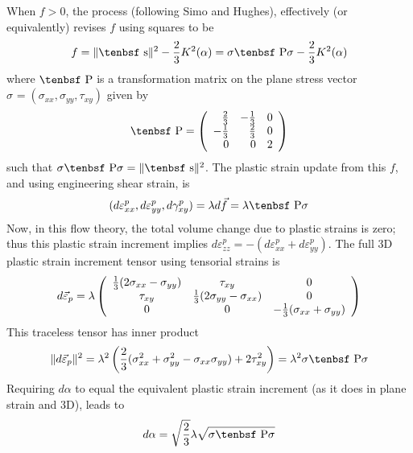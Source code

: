 \documentclass[11pt]{article}
\def\dev{\hbox{\tenbsf s}}
\def\dpl{d \vec{\varepsilon}_{p}}
\def\df{d \vec{f}}
\def\P{\hbox{\tenbsf P}}
\def\s#1{\sigma_{#1}}
\begin{document}
When $f>0$, the process (following Simo and Hughes), effectively (or equivalently) revises $f$ using squares to be
\begin{equation}
       f = \|\dev\|^2 - {2\over 3}K^2(\alpha) = \s{} \P\s{} - {2\over 3}K^2(\alpha)
\end{equation}
where $\P$ is a transformation matrix on the plane stress vector $\s{} = (\s{xx}, \s{yy}, \tau_{xy})$ given by
\begin{equation}
          \P = \left( \begin{array}{rrr}
                    {2\over 3} & -{1\over 3} & 0 \\ 
                    -{1\over 3} & {2\over 3} & 0 \\ 0 & 0 & 2 \end{array}\right)
\end{equation}
such that $\s{} \P\s{} = \|\dev\|^2$. The plastic strain update from this $f$, and using engineering shear strain, is
\begin{equation}
     (d\varepsilon_{xx}^p,  d\varepsilon_{yy}^p, d\gamma_{xy}^p) = \lambda \df = \lambda \P\s{}
\end{equation}
Now, in this flow theory, the total volume change due to plastic strains is zero; thus this plastic strain increment implies $d\varepsilon_{zz}^p = - (d\varepsilon_{xx}^p + d\varepsilon_{yy}^p)$. The full 3D plastic strain increment tensor using tensorial strains is
\begin{equation}
          \dpl = \lambda \left( \begin{array}{ccc}
                    {1\over 3}(2\s{xx}-\s{yy})& \tau_{xy} & 0 \\ 
                    \tau_{xy} & {1\over 3}(2\s{yy}-\s{xx}) & 0 \\ 0 & 0 & -{1\over 3}(\s{xx}+\s{yy}) \end{array}\right)
\end{equation}
This traceless tensor has inner product
\begin{equation}
  \|\dpl\|^2 = \lambda^2 \left( {2\over 3}(\s{xx}^2 + \s{yy}^2 - \s{xx}\s{yy}) + 2\tau_{xy}^2\right) = \lambda^2 \s{} \P\s{}
\end{equation}
Requiring $d\alpha$ to equal the equivalent plastic strain increment (as it does in plane strain and 3D), leads to
\begin{equation}
        d\alpha = \sqrt{2\over3}\lambda \sqrt{\s{} \P\s{}}
\end{equation}
\end{document}
